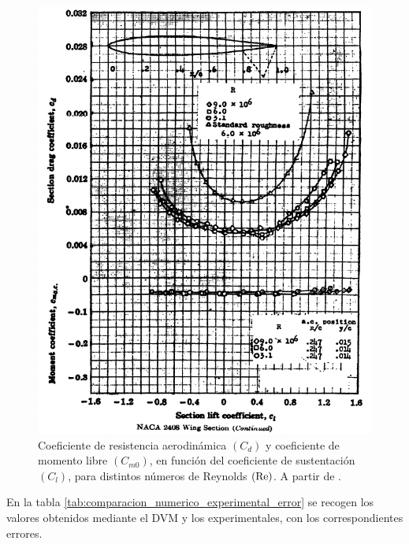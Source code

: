 \begin{figure}[ht] 
    \centering

    \includegraphics[width=\linewidth]{imagenes/validacion/validacion_abbot_Cm0.pdf}
    \caption{Coeficiente de resistencia aerodinámica $\left( C_d \right)$ y coeficiente de momento libre $\left( C_{m0} \right)$, en función del coeficiente de sustentación $\left( C_l \right)$, para distintos números de Reynolds $\left( \mathrm{Re} \right)$. A partir de \cite{abbott}.}
    \label{fig:validacion_abbot_Cm0}
\end{figure}

En la tabla \ref{tab:comparacion_numerico_experimental_error} se recogen los valores obtenidos mediante el DVM y los experimentales, con los correspondientes errores.

